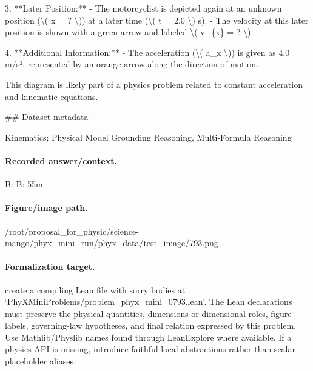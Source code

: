 3. **Later Position:**
   - The motorcyclist is depicted again at an unknown position (\textbackslash{}( x = ? \textbackslash{})) at a later time (\textbackslash{}( t = 2.0 \textbackslash{}) s).
   - The velocity at this later position is shown with a green arrow and labeled \textbackslash{}( v\_\{x\} = ? \textbackslash{}).

4. **Additional Information:**
   - The acceleration (\textbackslash{}( a\_x \textbackslash{})) is given as 4.0 m/s², represented by an orange arrow along the direction of motion.

This diagram is likely part of a physics problem related to constant acceleration and kinematic equations.

\#\# Dataset metadata

Kinematics; Physical Model Grounding Reasoning, Multi-Formula Reasoning

\paragraph{Recorded answer/context.}
B: B: 55m

\paragraph{Figure/image path.}
/root/proposal\_for\_physic/science-mango/phyx\_mini\_run/phyx\_data/test\_image/793.png

\paragraph{Formalization target.}
create a compiling Lean file with sorry bodies at `PhyXMiniProblems/problem\_phyx\_mini\_0793.lean`. The Lean declarations must preserve the physical quantities, dimensions or dimensional roles, figure labels, governing-law hypotheses, and final relation expressed by this problem.
Use Mathlib/Physlib names found through LeanExplore where available. If a physics API is missing, introduce faithful local abstractions rather than scalar placeholder aliases.


